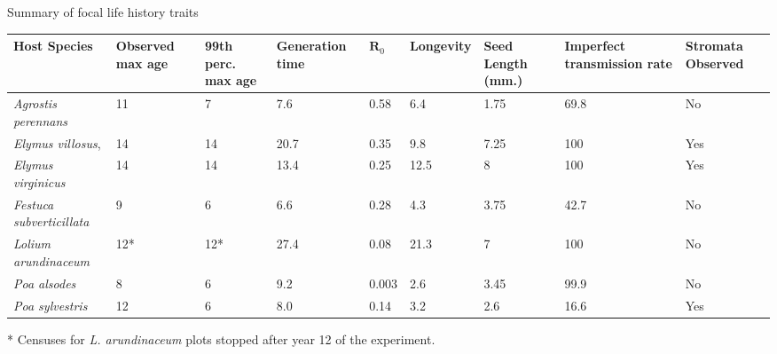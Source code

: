 \documentclass[12pt]{article}
\newcommand{\tom}[2]{{\color{red}{#1}}\footnote{\textit{\color{red}{#2}}}}
\begin{document}



 Summary of focal life history traits \\
\begin{table}[ht]
\begin{adjustbox}{width=1\textwidth}{
\begin{tabular}{|p{4cm}| p{2cm} |p{2cm}|p{2cm}| p{1cm}|p{2cm}|p{2cm}|p{2.5cm}| p{2cm}|}
	\hline
	\bf{Host Species} & \bf{Observed max age}& \bf{99th perc. max age}&\bf{Generation time} & $\mathbf{R}_0$ &\bf{Longevity}&\bf{Seed Length (mm.)}&\bf{Imperfect transmission rate} & \bf{Stromata Observed}\\
	\hline
	\emph{Agrostis perennans} &11&7&7.6&0.58&6.4&1.75&69.8&No\\
	\emph{Elymus villosus}, &14&14&20.7&0.35&9.8&7.25&100&Yes\\
	\emph{Elymus virginicus} &14&14&13.4&0.25&12.5&8&100&Yes\\
	\emph{Festuca subverticillata} &9&6&6.6&0.28&4.3&3.75&42.7&No\\
	\emph{Lolium arundinaceum} &12*&12*&27.4&0.08&21.3&7&100&No\\
	\emph{Poa alsodes} &8&6&9.2&0.003&2.6&3.45&99.9&No\\
	\emph{Poa sylvestris}&12&6&8.0&0.14&3.2&2.6&16.6&Yes\\
	 \hline
\end{tabular}}
\end{adjustbox}
\end{table}

* Censuses for \emph{L. arundinaceum} plots stopped after year 12 of the experiment.
\end{document}
